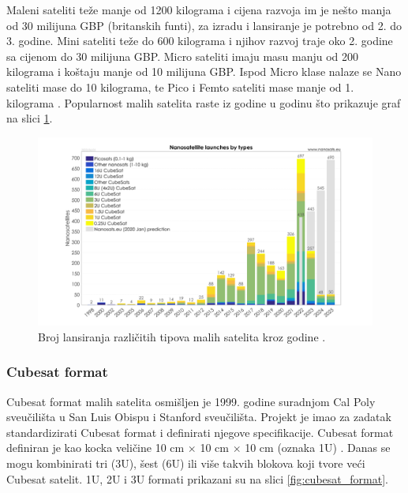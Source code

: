 \documentclass[times, utf8, diplomski, numeric]{templates/template}
\begin{document}
{{{            Maleni sateliti teže manje od 1200 kilograma i cijena razvoja im je nešto manja od 30 milijuna GBP (britanskih funti), za izradu i lansiranje je potrebno od 2. do 3. godine. Mini sateliti teže do 600 kilograma i njihov razvoj traje oko 2. godine sa cijenom do 30 milijuna GBP. Micro sateliti imaju masu manju od 200 kilograma i koštaju manje od 10 milijuna GBP. Ispod Micro klase nalaze se Nano sateliti mase do 10 kilograma, te Pico i Femto sateliti mase manje od 1. kilograma \cite{hrvatskiVojnik}. Popularnost malih satelita raste iz godine u godinu što prikazuje graf na slici \ref{fig:lansiranja_po_godini}.

            \begin{figure}[htb]
            \centering
            \includegraphics[width=1.0\textwidth]{images/lansiranja_po_godini.png}
            \caption{Broj lansiranja različitih tipova malih satelita kroz godine \cite{nanosats}.}
            \label{fig:lansiranja_po_godini}
            \end{figure}
        }

            \subsubsection{Cubesat format}{
                Cubesat format malih satelita osmišljen je 1999. godine suradnjom Cal Poly sveučilišta u San Luis Obispu i Stanford sveučilišta. Projekt je imao za zadatak standardizirati Cubesat format i definirati njegove specifikacije. Cubesat format definiran je kao kocka veličine 10 cm $\times$ 10 cm $\times$ 10 cm (oznaka 1U) \cite{fersat}. Danas se mogu kombinirati tri (3U), šest (6U) ili više takvih blokova koji tvore veći Cubesat satelit. 1U, 2U i 3U formati prikazani su na slici \ref{fig:cubesat_format}.

}}}
\end{document}
